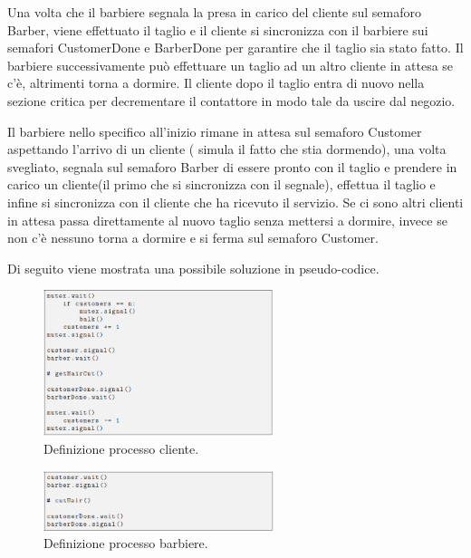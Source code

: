 Una volta che il barbiere segnala la presa in carico del cliente sul semaforo \textsf{Barber}, viene effettuato il taglio e il cliente si sincronizza con il barbiere sui semafori \textsf{CustomerDone} e \textsf{BarberDone} per garantire che il taglio sia stato fatto. Il barbiere successivamente può effettuare un taglio ad un altro cliente in attesa se c'è, altrimenti torna a dormire. Il cliente dopo il taglio entra di nuovo nella sezione critica per decrementare il contattore in modo tale da uscire dal negozio.

Il barbiere nello specifico all'inizio rimane in attesa sul semaforo \textsf{Customer} aspettando l'arrivo di un cliente ( simula il fatto che stia dormendo), una volta svegliato, segnala sul semaforo \textsf{Barber} di essere pronto con il taglio e prendere in carico un cliente(il primo che si sincronizza con il segnale), effettua il taglio e infine si sincronizza con il cliente che ha ricevuto il servizio. Se ci sono altri clienti in attesa passa direttamente al nuovo taglio senza mettersi a dormire, invece se non c'è nessuno torna a dormire e si ferma sul semaforo \textsf{Customer}.

\pagebreak
Di seguito viene mostrata una possibile soluzione in pseudo-codice.


\begin{figure}[h]
	\centering
	\includegraphics[width=0.6\textwidth]{Figure/2.png}
	\caption{Definizione processo cliente.}
\end{figure}

\begin{figure}[h]
	\centering
	\includegraphics[width=0.6\textwidth]{Figure/3.png}
	\caption{Definizione processo barbiere.}
\end{figure}
